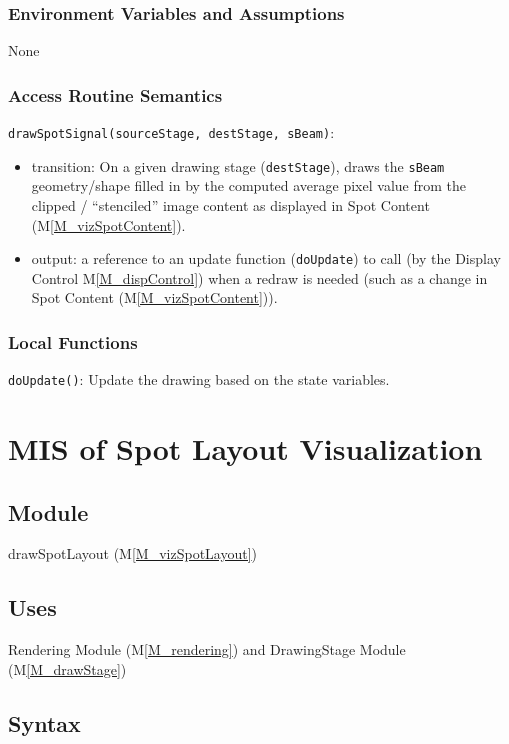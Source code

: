 \documentclass[12pt, titlepage]{article}
\newcommand{\mref}[1]{M\ref{#1}}
\newcommand{\mrefp}[1]{(\mref{#1})}
\newcommand{\mreff}[1]{Module \mrefp{#1}}
\newcommand{\code}[1]{\texttt{#1}}
\begin{document}
\subsubsection{Environment Variables and Assumptions}
None

\subsubsection{Access Routine Semantics}

\noindent \code{drawSpotSignal(sourceStage, destStage, sBeam)}:
\begin{itemize}
  \item transition: On a given drawing stage (\code{destStage}),
  draws the \code{sBeam} geometry/shape filled in by the computed average pixel value
  from the clipped / ``stenciled'' image content as displayed in
  Spot Content \mrefp{M_vizSpotContent}.
\item output: a reference to an update function (\code{doUpdate})
  to call (by the Display Control \mref{M_dispControl})
  when a redraw is needed (such as a change in Spot Content \mrefp{M_vizSpotContent}).
\end{itemize}

\subsubsection{Local Functions}
\code{doUpdate()}: Update the drawing based on the state variables.

\newpage



\section{MIS of Spot Layout Visualization} \label{MS_vizSpotLayout}

\subsection{Module}
drawSpotLayout \mrefp{M_vizSpotLayout}

\subsection{Uses}
Rendering \mreff{M_rendering} and DrawingStage \mreff{M_drawStage}

\subsection{Syntax}
\end{document}
